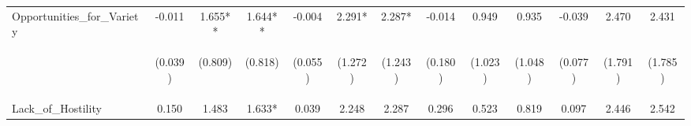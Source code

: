 \begin{tabular}{lcccccccccccc}
\noalign{\smallskip}Opportunities_for_Variety & -0.011 & 1.655** & 1.644** & -0.004 & 2.291* & 2.287* & -0.014 & 0.949 & 0.935 & -0.039 & 2.470 & 2.431\\
 & \begin{footnotesize}(0.039)\end{footnotesize} & \begin{footnotesize}(0.809)\end{footnotesize} & \begin{footnotesize}(0.818)\end{footnotesize} & \begin{footnotesize}(0.055)\end{footnotesize} & \begin{footnotesize}(1.272)\end{footnotesize} & \begin{footnotesize}(1.243)\end{footnotesize} & \begin{footnotesize}(0.180)\end{footnotesize} & \begin{footnotesize}(1.023)\end{footnotesize} & \begin{footnotesize}(1.048)\end{footnotesize} & \begin{footnotesize}(0.077)\end{footnotesize} & \begin{footnotesize}(1.791)\end{footnotesize} & \begin{footnotesize}(1.785)\end{footnotesize}\\
\noalign{\smallskip}Lack_of_Hostility & 0.150 & 1.483 & 1.633* & 0.039 & 2.248 & 2.287 & 0.296 & 0.523 & 0.819 & 0.097 & 2.446 & 2.542\\

\end{tabular}
